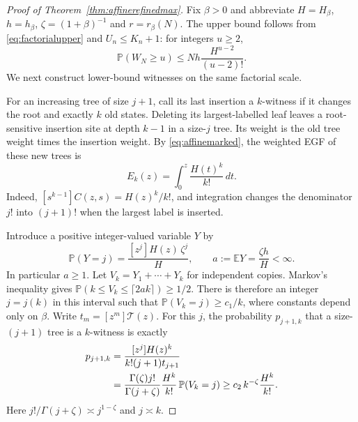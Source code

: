 \documentclass[runningheads,envcountsame,orivec]{llncs}
\newcommand{\E}{\mathbb E}
\newcommand{\PP}{\mathbb P}
\begin{document}
\begin{proof}[Proof of Theorem~\ref{thm:affinerefinedmax}]
Fix $\beta>0$ and abbreviate $H=H_\beta$, $h=h_\beta$,
$\zeta=(1+\beta)^{-1}$ and $r=r_\beta(N)$. The upper bound follows
from \eqref{eq:factorialupper} and $U_n\le K_n+1$: for integers
$u\ge2$,
\begin{equation}\label{eq:maximumfactorialupper}
 \PP(W_N\ge u)\le Nh\frac{H^{u-2}}{(u-2)!}.
\end{equation}
We next construct lower-bound witnesses on the same factorial scale.

For an increasing tree of size $j+1$, call its last insertion a
$k$-witness if it changes the root and exactly $k$ old states.
Deleting its largest-labelled leaf leaves a root-sensitive insertion
site at depth $k-1$ in a size-$j$ tree. Its weight is the old tree
weight times the insertion weight. By \eqref{eq:affinemarked},
the weighted EGF of these new trees is
\begin{equation}\label{eq:witnessEGF}
 E_k(z)=\int_0^z\frac{H(t)^k}{k!}\,dt.
\end{equation}
Indeed, $[s^{k-1}]C(z,s)=H(z)^k/k!$, and integration changes
the denominator $j!$ into $(j+1)!$ when the largest label is inserted.

Introduce a positive integer-valued variable $Y$ by
\[
 \PP(Y=j)=\frac{[z^j]H(z)\,\zeta^j}{H},\qquad
 a:=\E Y=\frac{\zeta h}{H}<\infty.
\]
In particular $a\ge1$. Let $V_k=Y_1+\cdots+Y_k$ for independent
copies. Markov's inequality gives
$\PP(k\le V_k\le\lceil2ak\rceil)\ge1/2$.
There is therefore an integer $j=j(k)$ in this interval such that
$\PP(V_k=j)\ge c_1/k$, where constants depend only on $\beta$.
Write $t_m=[z^m]\mathcal T(z)$. For this $j$, the probability
$p_{j+1,k}$ that a size-$(j+1)$ tree is a $k$-witness is exactly
\begin{align}
 p_{j+1,k}
 &=\frac{[z^j]H(z)^k}{k!(j+1)t_{j+1}}\notag\\
 &=\frac{\Gamma(\zeta)j!}{\Gamma(j+\zeta)}
      \frac{H^k}{k!}\,\PP(V_k=j)
 \ge c_2\,k^{-\zeta}\frac{H^k}{k!}.
 \label{eq:witnessprobability}
\end{align}
Here $j!/\Gamma(j+\zeta)\asymp j^{1-\zeta}$ and $j\asymp k$.


\end{proof}
\end{document}
